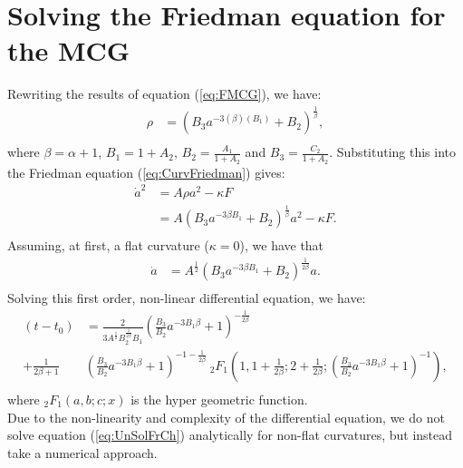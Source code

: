 \documentclass[a4paper, 11pt]{FSKH_623_Report}
\numberwithin{equation}{section}
\newcommand{\brac}[1]{\left(#1\right)}
\begin{document}
\section{Solving the Friedman equation for the MCG}
Rewriting the results of equation (\ref{eq:FMCG}), we have:
\begin{equation}\label{eq:ReFMCG}
\begin{split}
\rho&=\brac{B_{3}a^{-3\brac{\beta}\brac{B_{1}}}+B_{2}}^{\frac{1}{\beta}},\\
\end{split}
\end{equation}
where $\beta=\alpha+1$, $B_{1}=1+A_{2}$, $B_{2}=\frac{A_{1}}{1+A_{2}}$ and $B_{3}=\frac{C_{2}}{1+A_{2}}$. Substituting this into the Friedman equation (\ref{eq:CurvFriedman}) gives:
\begin{equation}\label{eq:UnSolFrCh}
\begin{split}
\dot{a}^{2} &= A\rho a^{2}-\kappa F\\
&= A\brac{B_{3}a^{-3\beta B_{1}}+B_{2}}^{\frac{1}{\beta}} a^{2}-\kappa F.\\
\end{split}
\end{equation}
Assuming, at first, a flat curvature ($\kappa=0$), we have that
\begin{equation}\label{eq:MCGFFC}
\begin{split}
\dot{a}&= A^{\frac{1}{2}}\brac{B_{3}a^{-3\beta B_{1}}+B_{2}}^{\frac{1}{2\beta}} a.\\
\end{split}
\end{equation}
Solving this first order, non-linear differential equation, we have:
\begin{equation}\label{eq:FmEqMCGSol}
\begin{split}
\brac{t-t_{0}}&=\frac{2}{3A^{\frac{1}{2}}B_{2}^{\frac{1}{2\beta}}B_{1}}\brac{\frac{B_{3}}{B_{2}}a^{-3B_{1}\beta}+1}^{-\frac{1}{2\beta}}\\
+\frac{1}{2\beta+1}&\brac{\frac{B_{3}}{B_{2}}a^{-3B_{1}\beta}+1}^{-1-\frac{1}{2\beta}}\ _{2}F_{1}\brac{1,1+\frac{1}{2\beta};2+\frac{1}{2\beta};\brac{\frac{B_{3}}{B_{2}}a^{-3B_{1}\beta}+1}^{-1}},\\
\end{split}
\end{equation}
where $_{2}F_{1}\brac{a,b;c;x}$ is the hyper geometric function. \\
Due to the non-linearity and complexity of the differential equation, we do not solve equation (\ref{eq:UnSolFrCh}) analytically for non-flat curvatures, but instead take a numerical approach.
\end{document}
